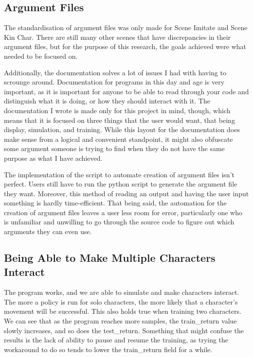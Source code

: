 \documentclass{l4proj}
\begin{document}
\subsection{Argument Files}
The standardisation of argument files was only made for Scene Imitate and Scene Kin Char. There are still many other scenes that have discrepancies in their argument files, but for the purpose of this research, the goals achieved were what needed to be focused on.

Additionally, the documentation solves a lot of issues I had with having to scrounge around. Documentation for programs in this day and age is very important, as it is important for anyone to be able to read through your code and distinguish what it is doing, or how they should interact with it. The documentation I wrote is made only for this project in mind, though, which means that it is focused on three things that the user would want, that being display, simulation, and training. While this layout for the documentation does make sense from a logical and convenient standpoint, it might also obfuscate some argument someone is trying to find when they do not have the same purpose as what I have achieved.

The implementation of the script to automate creation of argument files isn't perfect. Users still have to run the python script to generate the argument file they want. Moreover, this method of reading an output and having the user input something is hardly time-efficient. That being said, the automation for the creation of argument files leaves a user less room for error, particularly one who is unfamiliar and unwilling to go through the source code to figure out which arguments they can even use.

\subsection{Being Able to Make Multiple Characters Interact}
The program works, and we are able to simulate and make characters interact. The more a policy is run for solo characters, the more likely that a character's movement will be successful. This also holds true when training two characters. We can see that as the program reaches more samples, the train\_return value slowly increases, and so does the test\_return. Something that might confuse the results is the lack of ability to pause and resume the training, as trying the workaround to do so tends to lower the train\_return field for a while.
\end{document}
